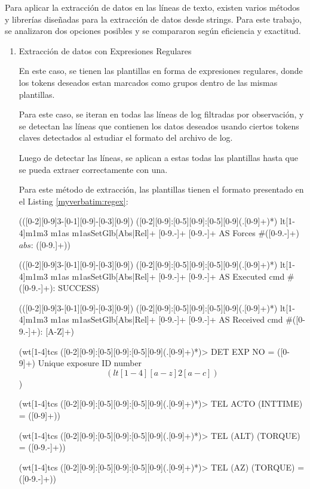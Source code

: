 Para aplicar la extracción de datos en las líneas de texto, existen varios métodos y librerías diseñadas para la extracción de datos desde strings. Para este trabajo, se analizaron dos opciones posibles y se compararon según eficiencia y exactitud.

\begin{enumerate}

    \item{Extracción de datos con Expresiones Regulares}
    
    En este caso, se tienen las plantillas en forma de expresiones regulares, donde los tokens deseados estan marcados como grupos dentro de las mismas plantillas.

    Para este caso, se iteran en todas las líneas de log filtradas por observación, y se detectan las líneas que contienen los datos deseados usando ciertos tokens claves detectados al estudiar el formato del archivo de log.

    Luego de detectar las líneas, se aplican a estas todas las plantillas hasta que se pueda extraer correctamente con una.

    Para este método de extracción, las plantillas tienen el formato presentado en el Listing \ref{myverbatim:regex}:

    \begin{myverbatim}[caption={Plantillas Regex},label={myverbatim:regex}]

(([0-2][0-9]{3}-[0-1][0-9]-[0-3][0-9]) ([0-2][0-9]:[0-5][0-9]:[0-5][0-9](.[0-9]+)*) lt[1-4]m1m3 m1as m1asSetGlb[Abs|Rel]+ [0-9.-]+ [0-9.-]+ AS Forces #([0-9.-]+) \(abs\): ([0-9.\-\s]+))

(([0-2][0-9]{3}-[0-1][0-9]-[0-3][0-9]) ([0-2][0-9]:[0-5][0-9]:[0-5][0-9](.[0-9]+)*) lt[1-4]m1m3 m1as m1asSetGlb[Abs|Rel]+ [0-9.-]+ [0-9.-]+ AS Executed cmd #([0-9.-]+): SUCCESS)

(([0-2][0-9]{3}-[0-1][0-9]-[0-3][0-9]) ([0-2][0-9]:[0-5][0-9]:[0-5][0-9](.[0-9]+)*) lt[1-4]m1m3 m1as m1asSetGlb[Abs|Rel]+ [0-9.-]+ [0-9.-]+ AS Received cmd #([0-9.-]+): [A-Z]+)

(wt[1-4]tcs ([0-2][0-9]:[0-5][0-9]:[0-5][0-9](.[0-9]+)*)> DET EXP NO = ([0-9]+) \/ Unique exposure ID number \[(lt[1-4][a-z]{2}[a-c])\])

(wt[1-4]tcs ([0-2][0-9]:[0-5][0-9]:[0-5][0-9](.[0-9]+)*)> TEL ACTO (INTTIME) = ([0-9]+))

(wt[1-4]tcs ([0-2][0-9]:[0-5][0-9]:[0-5][0-9](.[0-9]+)*)> TEL (ALT) (TORQUE) = ([0-9.-]+))

(wt[1-4]tcs ([0-2][0-9]:[0-5][0-9]:[0-5][0-9](.[0-9]+)*)> TEL (AZ) (TORQUE) = ([0-9.-]+))


\end{myverbatim}
\end{enumerate}
